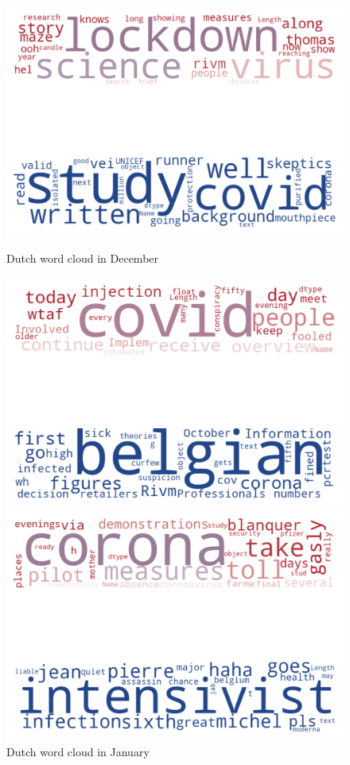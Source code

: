 \begin{landscape}
\begin{figure}[!htb]
  \includegraphics[width=\linewidth]{December nl word cloud.png}
  \caption{Dutch word cloud in December}\label{fig:decembernl}
\endminipage\hfill
{}
  \includegraphics[width=\linewidth]{January nl word cloud.png}
  \caption{Dutch word cloud in January}\label{fig:januarynl}
\endminipage\hfill
{}
  \includegraphics[width=\linewidth]{February nl word cloud.png}

\end{figure}
\end{landscape}
